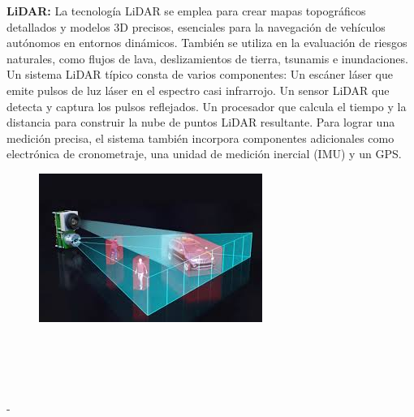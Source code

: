 \vspace{20pt}  %
\textbf{LiDAR:}
La tecnología LiDAR se emplea para crear mapas topográficos detallados y modelos 3D precisos, esenciales para la navegación de vehículos autónomos en entornos dinámicos. También se utiliza en la evaluación de riesgos naturales, como flujos de lava, deslizamientos de tierra, tsunamis e inundaciones.
Un sistema LiDAR típico consta de varios componentes:
Un escáner láser que emite pulsos de luz láser en el espectro casi infrarrojo.
Un sensor LiDAR que detecta y captura los pulsos reflejados.
Un procesador que calcula el tiempo y la distancia para construir la nube de puntos LiDAR resultante.
Para lograr una medición precisa, el sistema también incorpora componentes adicionales como electrónica de cronometraje, una unidad de medición inercial (IMU) y un GPS.
\vspace{10pt}  %

\begin{figure}[h]
	\centering
	\includegraphics[width=0.3\linewidth]{img/lidar}
	\caption{}
	\label{fig:lidar}
\end{figure}

\textbf{}\\\\\\\\-
